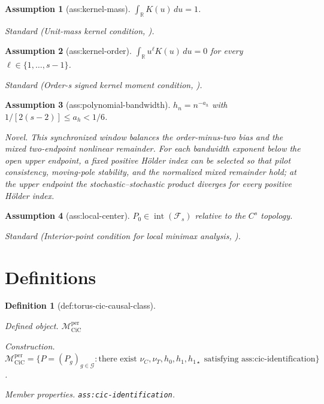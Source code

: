 \documentclass{article}
\newtheorem{assumption}{Assumption}
\newtheorem{definition}{Definition}
\begin{document}
\begin{assumption}[ass:kernel-mass]\label{ass:kernel-mass}
\(\int_{\mathbb R}K(u)\,du=1\).
\par\smallskip\noindent\emph{Standard} (Unit-mass kernel condition, \cite{ManoleBalakrishnanNilesWeedWasserman2023CLT}).
\end{assumption}

\begin{assumption}[ass:kernel-order]\label{ass:kernel-order}
\(\int_{\mathbb R}u^\ell K(u)\,du=0\) for every \(\ell\in\{1,\ldots,s-1\}\).
\par\smallskip\noindent\emph{Standard} (Order-s signed kernel moment condition, \cite{ManoleBalakrishnanNilesWeedWasserman2023CLT}).
\end{assumption}

\begin{assumption}[ass:polynomial-bandwidth]\label{ass:polynomial-bandwidth}
\(h_n=n^{-a_h}\) with \(1/[2(s-2)]\leq a_h<1/6\).
\par\smallskip\noindent\emph{Novel.} This synchronized window balances the order-minus-two bias and the mixed two-endpoint nonlinear remainder. For each bandwidth exponent below the open upper endpoint, a fixed positive Hölder index can be selected so that pilot consistency, moving-pole stability, and the normalized mixed remainder hold; at the upper endpoint the stochastic--stochastic product diverges for every positive Hölder index.
\end{assumption}

\begin{assumption}[ass:local-center]\label{ass:local-center}
\(P_0\in\operatorname{int}(\mathcal F_s)\) relative to the \(C^s\) topology.
\par\smallskip\noindent\emph{Standard} (Interior-point condition for local minimax analysis, \cite{HutterRigollet2021Minimax}).
\end{assumption}

\section{Definitions}

\begin{definition}[def:torus-cic-causal-class]\label{def:torus-cic-causal-class}
\par\smallskip\noindent\emph{Defined object.} \(\mathcal M_{\mathrm{CiC}}^{\mathrm{per}}\)
\par\smallskip\noindent\emph{Construction.} \(\mathcal M_{\mathrm{CiC}}^{\mathrm{per}}=\{P=(P_g)_{g\in\mathcal G}:\text{there exist }\nu_C,\nu_T,h_0,h_1,h_{1\star}\text{ satisfying ass:cic-identification}\}\).
\par\smallskip\noindent\emph{Member properties.} \texttt{ass:\allowbreak{}cic-\allowbreak{}identification}.
\end{definition}
\end{document}

